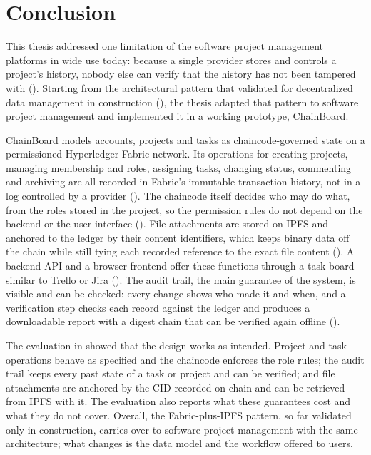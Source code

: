 \chapter{Conclusion}
\label{ch:conclusion}

This thesis addressed one limitation of the software project management platforms in wide use today: because a single provider stores and controls a project's history, nobody else can verify that the history has not been tampered with (). Starting from the architectural pattern that \textcite{adel2023} validated for decentralized data management in construction (), the thesis adapted that pattern to software project management and implemented it in a working prototype, ChainBoard.

ChainBoard models accounts, projects and tasks as chaincode-governed state on a permissioned Hyperledger Fabric network. Its operations for creating projects, managing membership and roles, assigning tasks, changing status, commenting and archiving are all recorded in Fabric's immutable transaction history, not in a log controlled by a provider (). The chaincode itself decides who may do what, from the roles stored in the project, so the permission rules do not depend on the backend or the user interface (). File attachments are stored on IPFS and anchored to the ledger by their content identifiers, which keeps binary data off the chain while still tying each recorded reference to the exact file content (). A backend API and a browser frontend offer these functions through a task board similar to Trello or Jira (). The audit trail, the main guarantee of the system, is visible and can be checked: every change shows who made it and when, and a verification step checks each record against the ledger and produces a downloadable report with a digest chain that can be verified again offline ().

The evaluation in  showed that the design works as intended. Project and task operations behave as specified and the chaincode enforces the role rules; the audit trail keeps every past state of a task or project and can be verified; and file attachments are anchored by the CID recorded on-chain and can be retrieved from IPFS with it. The evaluation also reports what these guarantees cost and what they do not cover. Overall, the Fabric-plus-IPFS pattern, so far validated only in construction, carries over to software project management with the same architecture; what changes is the data model and the workflow offered to users.

